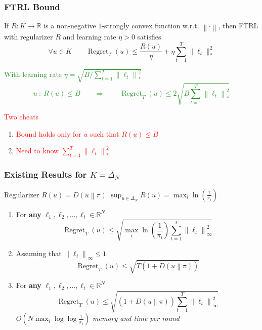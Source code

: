 \documentclass[usenames,dvipsnames]{beamer}
\DeclareMathOperator{\Regret}{Regret}
\newcommand{\R}{\mathbb{R}}
\newcommand{\norm}[1]{\left\|#1\right\|}
\newcommand{\KL}[2]{D\left({#1}\middle\|{#2}\right)}
\newcommand{\Cite}[1]{{\tiny \textcolor{Blue}{[#1]}}}
\begin{document}
\begin{frame}
\frametitle{FTRL Bound}

\begin{theorem}[\textcolor{Blue}{CBL'06, SS'11}]
If $R:K \to \R$ is a non-negative $1$-strongly convex function w.r.t. $\norm{\cdot}$, then FTRL
with regularizer $R$ and learning rate $\eta > 0$ satisfies
$$
\forall u \in K \qquad  \Regret_T(u) \le \frac{R(u)}{\eta} + \eta \sum_{t=1}^T \|\ell_t\|_*^2
$$
\end{theorem}

\textcolor{ForestGreen}{
With learning rate $\eta = \sqrt{B/\sum_{t=1}^T \norm{\ell_t}_*^2}$
$$
u \ : \ R(u) \le B \qquad \Longrightarrow \qquad \Regret_T(u) \le 2 \sqrt{B \sum_{t=1}^T \norm{\ell_t}_*^2}
$$}

\textcolor{red}{Two cheats}
\begin{enumerate}
\item \textcolor{red}{Bound holds only for $u$ such that $R(u) \le B$}
\item \textcolor{red}{Need to know $\sum_{t=1}^T \norm{\ell_t}_*^2$}
\end{enumerate}

\end{frame}

\begin{frame}
\frametitle{Existing Results for $K=\Delta_N$}

Regularizer $R(u) = \KL{u}{\pi}$ \qquad $\sup_{u \in \Delta_N} R(u) = \max_{i} \ln\left(\frac{1}{\pi_i} \right)$

\vspace{0.5cm}

\begin{enumerate}

\item For \textbf{any} $\ell_1, \ell_2, \dots, \ell_t \in \R^N$ \qquad \Cite{deREGK'11, OP'15}
$$
\Regret_T(u) \le \sqrt{\max_i \ln \left( \frac{1}{\pi_i} \right) \sum_{t=1}^T \norm{\ell_t}_\infty^2}
$$

\item Assuming that $\norm{\ell_t}_\infty \le 1$ \qquad \Cite{CFH'09, CV'10, LS'14, LS'15, KE'15, FRS'15, OP'16}
$$
\Regret_T(u) \le \sqrt{T \left(1 + \KL{u}{\pi}\right)}
$$

\item For \textbf{any} $\ell_1, \ell_2, \dots, \ell_t \in \R^N$ \qquad  \Cite{FRS'15+OP'15}
$$
\Regret_T(u) \le \sqrt{(1 + \KL{u}{\pi}) \sum_{t=1}^T \norm{\ell_t}_\infty^2}
$$
\emph{$O(N \max_{i} \log \log \frac{1}{\pi_i})$ memory and time per round}
\end{enumerate}
\end{frame}
\end{document}
